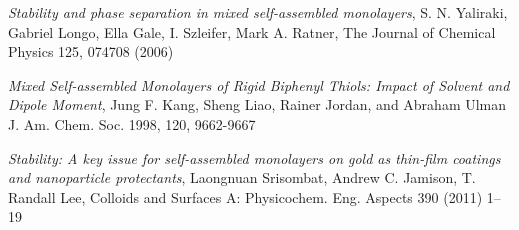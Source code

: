 \begin{thebibliography}{9}

 \emph{Stability and phase separation in mixed self-assembled monolayers},
   S. N. Yaliraki, Gabriel Longo, Ella Gale, I. Szleifer, Mark A. Ratner,
The Journal of Chemical Physics 125, 074708 (2006)

    \emph{Mixed Self-assembled Monolayers of Rigid Biphenyl Thiols: Impact of Solvent and Dipole Moment},
	Jung F. Kang, Sheng Liao, Rainer Jordan, and Abraham Ulman
	J. Am. Chem. Soc. 1998, 120, 9662-9667

    \emph{Stability: A key issue for self-assembled monolayers on gold as thin-film coatings and nanoparticle protectants},
    Laongnuan Srisombat, Andrew C. Jamison, T. Randall Lee,
    Colloids and Surfaces A: Physicochem. Eng. Aspects 390 (2011) 1– 19
    


\end{thebibliography}
